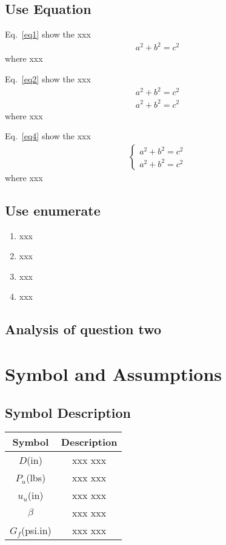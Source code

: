 \documentclass{swmcmthesis}
\begin{document}
\subsection{Use Equation}

Eq.~\eqref{eq1} show the xxx
\begin{align}
\label{eq1}
a^2+b^2=c^2
\end{align}
where xxx

Eq.~\eqref{eq2} show the xxx
\begin{align}
\label{eq2}
a^2+b^2=c^2\\
\label{eq3}
a^2+b^2=c^2
\end{align}
where xxx

Eq.~\eqref{eq4} show the xxx
\begin{align}
\label{eq4}
\begin{cases}
a^2+b^2=c^2\\
a^2+b^2=c^2
\end{cases}
\end{align}
where xxx

\subsection{Use enumerate}

\begin{enumerate}
\item xxx
\item xxx
\item xxx
\item xxx
\end{enumerate}

\subsection{Analysis of question two}
\lipsum[1-2]

\section{Symbol and Assumptions}
\lipsum[1-2]

\subsection{Symbol Description}

\begin{table}[!h]
\centering
\begin{tabular}{cc}
\toprule[1.5pt]
Symbol & Description\\
\midrule[1pt]
$D$(in)  & xxx xxx\\
$P_u$(lbs)  & xxx xxx\\
$u_u$(in)  & xxx xxx\\
$\beta$  & xxx xxx\\
$G_f$(psi.in) & xxx xxx\\
\bottomrule[1.5pt]
\end{tabular}
\end{table}
\end{document}
